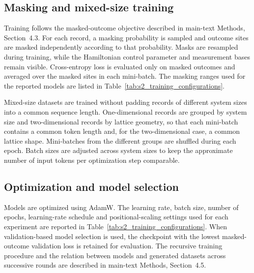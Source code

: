 \documentclass[11pt,a4paper]{article}
\newcommand{\subhead}[1]{\subsection*{#1}}
\begin{document}
\subhead{Masking and mixed-size training}

Training follows the masked-outcome objective described in main-text
Methods, Section~4.3. For each record, a masking probability is sampled
and outcome sites are masked independently according to that
probability. Masks are resampled during training, while the Hamiltonian
control parameter and measurement bases remain visible. Cross-entropy
loss is evaluated only on masked outcomes and averaged over the masked
sites in each mini-batch. The masking ranges used for the reported
models are listed in Table~\ref{tab:s2_training_configurations}.

Mixed-size datasets are trained without padding records of different
system sizes into a common sequence length. One-dimensional records are
grouped by system size and two-dimensional records by lattice geometry,
so that each mini-batch contains a common token length and, for the
two-dimensional case, a common lattice shape. Mini-batches from the
different groups are shuffled during each epoch. Batch sizes are
adjusted across system sizes to keep the approximate number of input
tokens per optimization step comparable.

\subhead{Optimization and model selection}

Models are optimized using AdamW. The learning rate, batch size, number
of epochs, learning-rate schedule and positional-scaling settings used
for each experiment are reported in
Table~\ref{tab:s2_training_configurations}. When validation-based model
selection is used, the checkpoint with the lowest masked-outcome
validation loss is retained for evaluation. The recursive training
procedure and the relation between models and generated datasets across
successive rounds are described in main-text Methods, Section~4.5.
\end{document}
